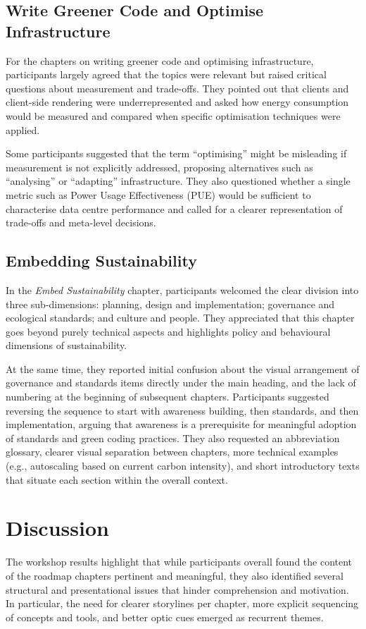 \documentclass[english]{lni}
\begin{document}
\subsection{Write Greener Code and Optimise Infrastructure}
For the chapters on writing greener code and optimising infrastructure, participants largely agreed that the topics were relevant but raised critical questions about measurement and trade-offs. They pointed out that clients and client-side rendering were underrepresented and asked how energy consumption would be measured and compared when specific optimisation techniques were applied.

Some participants suggested that the term \enquote{optimising} might be misleading if measurement is not explicitly addressed, proposing alternatives such as \enquote{analysing} or \enquote{adapting} infrastructure. They also questioned whether a single metric such as Power Usage Effectiveness (PUE) would be sufficient to characterise data centre performance and called for a clearer representation of trade-offs and meta-level decisions.

\subsection{Embedding Sustainability}
In the \emph{Embed Sustainability} chapter, participants welcomed the clear division into three sub-dimensions: planning, design and implementation; governance and ecological standards; and culture and people. They appreciated that this chapter goes beyond purely technical aspects and highlights policy and behavioural dimensions of sustainability.

At the same time, they reported initial confusion about the visual arrangement of governance and standards items directly under the main heading, and the lack of numbering at the beginning of subsequent chapters. Participants suggested reversing the sequence to start with awareness building, then standards, and then implementation, arguing that awareness is a prerequisite for meaningful adoption of standards and green coding practices. They also requested an abbreviation glossary, clearer visual separation between chapters, more technical examples (e.g., autoscaling based on current carbon intensity), and short introductory texts that situate each section within the overall context.

\section{Discussion}
The workshop results highlight that while participants overall found the content of the roadmap chapters pertinent and meaningful, they also identified several structural and presentational issues that hinder comprehension and motivation. In particular, the need for clearer storylines per chapter, more explicit sequencing of concepts and tools, and better optic cues emerged as recurrent themes.
\end{document}
